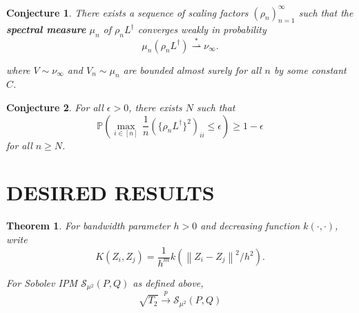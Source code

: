\documentclass{article}
\newcommand{\convprob}{\overset{p}{\to}}
\newcommand{\Prob}[1]{\mathbb{P}\left( #1 \right)}
\newcommand{\norm}[1]{\left\lVert#1\right\rVert}
\newcommand{\Linv}{L^{\dagger}}
\theoremstyle{alden}
\newtheorem{theorem}{Theorem}
\newtheorem{conjecture}{Conjecture}
\theoremstyle{definition}
\theoremstyle{remark}
\begin{document}
\begin{conjecture}
	\label{conj: spectral_measure_conv}
	There exists a sequence of scaling factors $(\rho_n)_{n = 1}^{\infty}$ such that the \textbf{spectral measure} $\mu_n$ of $\rho_n \Linv$ converges weakly in probability
	\begin{equation*}
	\mu_n(\rho_n \Linv) \overset{\ast}{\rightharpoonup} \nu_{\infty}.
	\end{equation*}
	
	
	where $V \sim \nu_{\infty}$ and $V_n \sim \mu_n$ are bounded almost surely for all $n$ by some constant $C$. 
\end{conjecture}

\begin{conjecture}
	\label{conj: diagonal_entries}
	For all $\epsilon > 0$, there exists $N$ such that
	\begin{equation*}
	\Prob{\underset{i \in [n]}{\max} \, \frac{1}{n} \left(\{ \rho_n \Linv\}^2 \right)_{ii} \leq \epsilon} \geq 1 - \epsilon
	\end{equation*}
	for all $n \geq N$.
\end{conjecture}

\section{DESIRED RESULTS}

\begin{theorem}
	\label{thm:convprob_of_T2}
	For bandwidth parameter $h >0$ and decreasing function $k(\cdot,\cdot)$, write
	\begin{equation*}
	K(Z_i,Z_j) = \frac{1}{h^m} k(\norm{Z_i - Z_j}^2 / h^2).
	\end{equation*}
	
	For Sobolev IPM $\mathcal{S}_{\mu^2}(P,Q)$ as defined above,
	\begin{equation*}
	\sqrt{T_2} \convprob \mathcal{S}_{\mu^2}(P,Q)
	\end{equation*}
\end{theorem}
\end{document}
